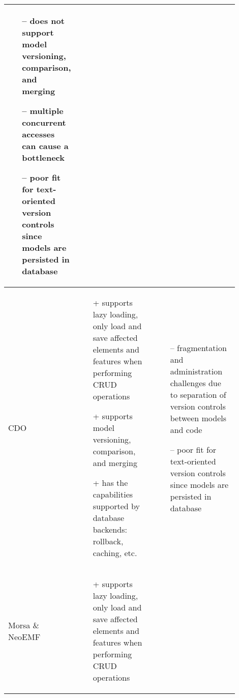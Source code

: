 \begin{table*}[]
\begin{scriptsize}
\begin{tabular}{
      |>{\centering\arraybackslash}m{0.1\linewidth}
      |>{\centering\arraybackslash}m{0.4\linewidth}
      |>{\centering\arraybackslash}m{0.4\linewidth}
      |}
\begin{minipage}[t]{\linewidth}
      \raggedright
      \begin{itemize}[leftmargin=7pt]
        \setlength
        \item[--] does not support model versioning, comparison, and merging
        \item[--] multiple concurrent accesses can cause a bottleneck
        \item[--] poor fit for text-oriented version controls since models are persisted in database
      \end{itemize}
    \end{minipage} 
    \\
    \hline
    CDO
    &
    \begin{minipage}[t]{\linewidth}
      \raggedright
      \begin{itemize}[leftmargin=7pt]
        \setlength
        \item[+] supports lazy loading, only load and save affected elements and features when performing CRUD operations
        \item[+] supports model versioning, comparison, and merging
        \item[+] has the capabilities supported by database backends: rollback, caching, etc. 
      \end{itemize}
    \end{minipage}
    &
    \begin{minipage}[t]{\linewidth}
      \raggedright
      \begin{itemize}[leftmargin=7pt]
        \setlength
        \item[--] fragmentation and administration challenges due to separation of version controls between models and code
        \item[--] poor fit for text-oriented version controls since models are persisted in database
      \end{itemize}
    \end{minipage} 
    \\
    \hline
    Morsa \& NeoEMF 
    & 
    \begin{minipage}[t]{\linewidth}
      \raggedright
      \begin{itemize}[leftmargin=7pt]
        \setlength
        \item[+] supports lazy loading, only load and save affected elements and features when performing CRUD operations

\end{itemize}
\end{minipage}
\end{tabular}
\end{scriptsize}
\end{table*}
